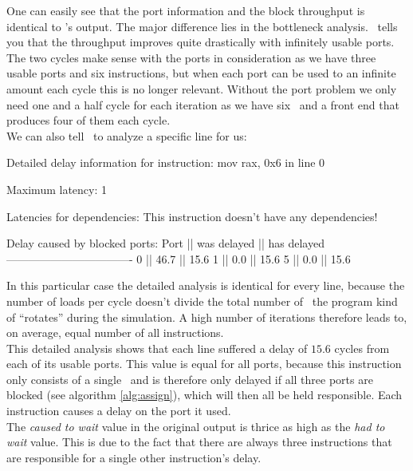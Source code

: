 One can easily see that the port information and the block throughput is identical to \iaca's output. The major difference lies in the bottleneck analysis. \suaca\ tells you that the throughput improves quite drastically with infinitely usable ports. The two cycles make sense with the ports in consideration as we have three usable ports and six instructions, but when each port can be used to an infinite amount each cycle this is no longer relevant. Without the port problem we only need one and a half cycle for each iteration as we have six \microops\ and a front end that produces four of them each cycle.\\
We can also tell \suaca\ to analyze a specific line for us:

\begin{example}
Detailed delay information for instruction: mov rax, 0x6 in line 0
    
            Maximum latency: 1
            
            Latencies for dependencies:
            This instruction doesn't have any dependencies!
                      
            Delay caused by blocked ports:
             Port || was delayed || has delayed
             ----------------------------------
              0   ||    46.7     ||    15.6
              1   ||     0.0     ||    15.6
              5   ||     0.0     ||    15.6
\end{example}

In this particular case the detailed analysis is identical for every line, because the number of loads per cycle doesn't divide the total number of \microops\ the program kind of ``rotates'' during the simulation. A high number of iterations therefore leads to, on average, equal number of all instructions.\\
This detailed analysis shows that each line suffered a delay of $15.6$ cycles from each of its usable ports. This value is equal for all ports, because this instruction only consists of a single \microop\ and is therefore only delayed if all three ports are blocked (see algorithm \ref{alg:assign}), which will then all be held responsible. Each instruction causes a delay on the port it used.\\
The \emph{caused to wait} value in the original output is thrice as high as the \emph{had to wait} value. This is due to the fact that there are always three instructions that are responsible for a single other instruction's delay.\\


